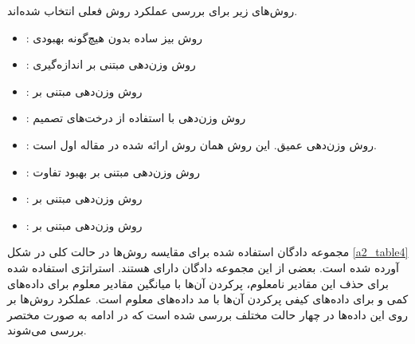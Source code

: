 \documentclass[12pt, a4paper]{article}
\begin{document}
روش‌های زیر برای بررسی عملکرد روش فعلی انتخاب شده‌اند.

\begin{itemize}
    \item {}: روش بیز ساده بدون هیچ‌گونه بهبودی
    \item {}: روش وزن‌دهی مبتنی بر اندازه‌گیری 
    \item {}: روش وزن‌دهی مبتنی بر 
    \item {}: روش وزن‌دهی با استفاده از درخت‌های تصمیم
    \item {}: روش وزن‌دهی عمیق. این روش همان روش ارائه شده در مقاله اول است.
    \item {}: روش وزن‌دهی مبتنی بر بهبود تفاوت
    \item {}: روش وزن‌دهی مبتنی بر 
    \item {}: روش وزن‌دهی مبتنی بر 
\end{itemize}

مجموعه دادگان استفاده شده برای مقایسه روش‌ها در حالت کلی در شکل \ref{a2_table4} آورده
شده است. بعضی از این مجموعه دادگان دارای  هستند. استراتژی
استفاده شده برای حذف این مقادیر نامعلوم، پرکردن آن‌ها با میانگین مقادیر معلوم
برای داده‌های کمی و برای داده‌های کیفی پرکردن آن‌ها با مد داده‌های معلوم است.
عملکرد روش‌ها بر روی این داده‌ها در چهار حالت مختلف بررسی شده است که در ادامه
به صورت مختصر بررسی می‌شوند.
\end{document}
